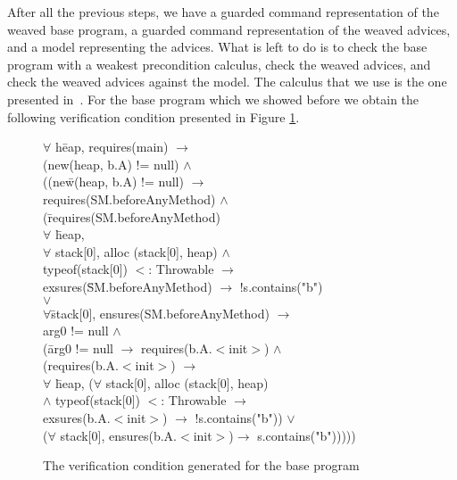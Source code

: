 After all the previous steps, we have a guarded command representation
of the weaved base program, a guarded command representation of the
weaved advices, and a model representing the advices.  What is left to
do is to check the base program with a weakest precondition calculus,
check the weaved advices, and check the weaved advices against the
model. The calculus that we use is the one presented
in~\cite{BarnettL05}.  For the base program which we showed before we
obtain the following verification condition presented in Figure \ref{vc}.
\vspace{-0.4cm}
\begin{figure}[ht]
\vspace{-0.4cm}
\bcode
$\forall$ h\=eap, 
   requires(main) $\rightarrow$\+\\
   (new(heap, b.A) != null) $\wedge$ \\
   ((ne\=w(heap, b.A) != null) $\rightarrow$\+\\
    requires(SM.beforeAnyMethod) $\wedge$ \\
    (\=requires(SM.beforeAnyMethod)\+\\
     $\forall$ \=heap,\+\\
       $\forall$ stack[0],
            alloc (stack[0], heap) $\wedge$\\ typeof(stack[0]) $<$: Throwable 
            $\rightarrow$\\
            exsures(\=SM.beforeAnyMethod) $\rightarrow$
	        !s.contains("b")\-\\

$\vee$\\
    $\forall$\= stack[0],
    ensures(SM.beforeAnyMethod) $\rightarrow$\+\\
    arg0 != null $\wedge$ \\
   (\=arg0 != null $\rightarrow$
    requires(b.A.$<$init$>$) $\wedge$\+\\
     (requires(b.A.$<$init$>$) $\rightarrow$\\
    $\forall$ \=heap,
      ($\forall$ stack[0],
         alloc (stack[0], heap)\+\\ $\wedge$ typeof(stack[0]) $<$: Throwable 
                     $\rightarrow$\\
                exsures(b.A.$<$init$>$) $\rightarrow$
                   !s.contains("b")) $\vee$\\
      ($\forall$ stack[0], ensures(b.A.$<$init$>$)$\rightarrow$  s.contains("b"))))) \\
 
\ecode
\vspace{-0.4cm}
\caption{The verification condition generated for the base program}
\label{vc}
\vspace{-0.4cm}
\end{figure}
